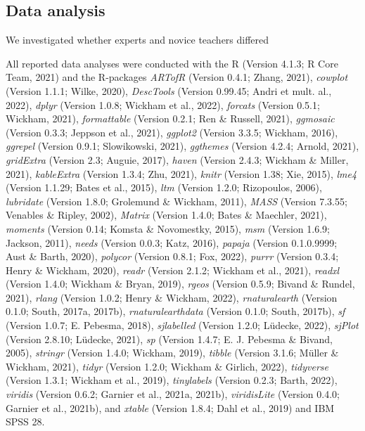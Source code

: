 \documentclass[
  man]{apa6}
\begin{document}
\hypertarget{data-analysis}{%
\subsection{Data analysis}\label{data-analysis}}

We investigated whether experts and novice teachers differed

All reported data analyses were conducted with the R (Version 4.1.3; R Core Team, 2021) and the R-packages \emph{ARTofR} (Version 0.4.1; Zhang, 2021), \emph{cowplot} (Version 1.1.1; Wilke, 2020), \emph{DescTools} (Version 0.99.45; Andri et mult. al., 2022), \emph{dplyr} (Version 1.0.8; Wickham et al., 2022), \emph{forcats} (Version 0.5.1; Wickham, 2021), \emph{formattable} (Version 0.2.1; Ren \& Russell, 2021), \emph{ggmosaic} (Version 0.3.3; Jeppson et al., 2021), \emph{ggplot2} (Version 3.3.5; Wickham, 2016), \emph{ggrepel} (Version 0.9.1; Slowikowski, 2021), \emph{ggthemes} (Version 4.2.4; Arnold, 2021), \emph{gridExtra} (Version 2.3; Auguie, 2017), \emph{haven} (Version 2.4.3; Wickham \& Miller, 2021), \emph{kableExtra} (Version 1.3.4; Zhu, 2021), \emph{knitr} (Version 1.38; Xie, 2015), \emph{lme4} (Version 1.1.29; Bates et al., 2015), \emph{ltm} (Version 1.2.0; Rizopoulos, 2006), \emph{lubridate} (Version 1.8.0; Grolemund \& Wickham, 2011), \emph{MASS} (Version 7.3.55; Venables \& Ripley, 2002), \emph{Matrix} (Version 1.4.0; Bates \& Maechler, 2021), \emph{moments} (Version 0.14; Komsta \& Novomestky, 2015), \emph{msm} (Version 1.6.9; Jackson, 2011), \emph{needs} (Version 0.0.3; Katz, 2016), \emph{papaja} (Version 0.1.0.9999; Aust \& Barth, 2020), \emph{polycor} (Version 0.8.1; Fox, 2022), \emph{purrr} (Version 0.3.4; Henry \& Wickham, 2020), \emph{readr} (Version 2.1.2; Wickham et al., 2021), \emph{readxl} (Version 1.4.0; Wickham \& Bryan, 2019), \emph{rgeos} (Version 0.5.9; Bivand \& Rundel, 2021), \emph{rlang} (Version 1.0.2; Henry \& Wickham, 2022), \emph{rnaturalearth} (Version 0.1.0; South, 2017a, 2017b), \emph{rnaturalearthdata} (Version 0.1.0; South, 2017b), \emph{sf} (Version 1.0.7; E. Pebesma, 2018), \emph{sjlabelled} (Version 1.2.0; Lüdecke, 2022), \emph{sjPlot} (Version 2.8.10; Lüdecke, 2021), \emph{sp} (Version 1.4.7; E. J. Pebesma \& Bivand, 2005), \emph{stringr} (Version 1.4.0; Wickham, 2019), \emph{tibble} (Version 3.1.6; Müller \& Wickham, 2021), \emph{tidyr} (Version 1.2.0; Wickham \& Girlich, 2022), \emph{tidyverse} (Version 1.3.1; Wickham et al., 2019), \emph{tinylabels} (Version 0.2.3; Barth, 2022), \emph{viridis} (Version 0.6.2; Garnier et al., 2021a, 2021b), \emph{viridisLite} (Version 0.4.0; Garnier et al., 2021b), and \emph{xtable} (Version 1.8.4; Dahl et al., 2019) and IBM SPSS 28.
\end{document}
